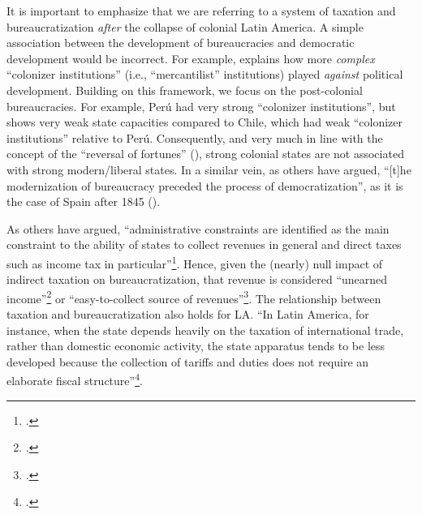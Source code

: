 \documentclass[onesided]{article}\usepackage[]{graphicx}\usepackage[]{color}
\begin{document}
It is important to emphasize that we are referring to a system of taxation and bureaucratization \emph{after} the collapse of colonial Latin America. A simple association between the development of bureaucracies and democratic development would be incorrect. For example, \citet[p. 26]{Mahoney:2010aa} explains how more \emph{complex} ``colonizer institutions'' (i.e., ``mercantilist'' institutions)  played \emph{against} political development. Building on this framework, we focus on the post-colonial bureaucracies. For example, Per\'u had very strong ``colonizer institutions'', but shows very weak state capacities compared to Chile, which had weak ``colonizer institutions'' relative to Per\'u. Consequently, and very much in line with the concept of the ``reversal of fortunes'' (\citet{Acemoglu:2002uh}), strong colonial states are not associated with strong modern/liberal states. In a similar vein, as others have argued, ``[t]he modernization of bureaucracy preceded the process of democratization'', as it is the case of Spain after 1845 (\citet[p. 43]{Rota2011a}).





As others have argued, ``administrative constraints are identified as the main constraint to the ability of states to collect revenues in general and direct taxes such as income tax in particular''\footnote{\citet[p. 5]{DiJohn2006}.}. Hence, given the  (nearly) null impact of indirect taxation on bureaucratization, that revenue is considered ``unearned income''\footnote{\citet[p. 304]{Moore2004a}.} or ``easy-to-collect source of revenues''\footnote{\citet[p. 10]{Coatsworth2002}.}. The relationship between taxation and bureaucratization also holds for LA. ``In Latin America, for instance, when the state depends heavily on the taxation of international trade, rather than domestic economic activity, the state apparatus tends to be less developed because the collection of tariffs and duties does not require an elaborate fiscal structure''\footnote{\citet[p. 177]{Campbell1993}.}. 
\end{document}
